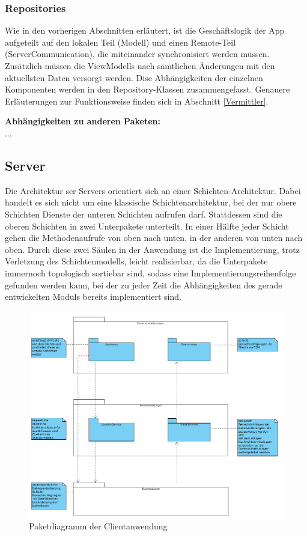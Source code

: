 \subsubsection{Repositories}
Wie in den vorherigen Abschnitten erläutert, ist die Geschäftslogik der App aufgeteilt auf den lokalen Teil (Modell) und einen Remote-Teil (ServerCommunication), die miteinander synchronisiert werden müssen. Zusätzlich müssen die ViewModells nach sämtlichen Änderungen mit den aktuellsten Daten versorgt werden. Dise Abhängigkeiten der einzelnen Komponenten werden in den Repository-Klassen zusammengefasst. Genauere Erläuterungen zur Funktionsweise finden sich in Abschnitt \ref{Vermittler}.

\textbf{Abhängigkeiten zu anderen Paketen:}\\
...

\subsection{Server}
Die Architektur ser Servers orientiert sich an einer Schichten-Architektur. Dabei handelt es sich nicht um eine klassische Schichtenarchitektur, bei der nur obere Schichten Dienste der unteren Schichten aufrufen darf. Stattdessen sind die oberen Schichten in zwei Unterpakete unterteilt. In einer Hälfte jeder Schicht gehen die Methodenaufrufe von oben nach unten, in der anderen von unten nach oben. Durch diese zwei Säulen in der Anwendung ist die Implementierung, trotz Verletzung des Schichtenmodells, leicht realisierbar, da die Unterpakete immernoch topologisch sortiebar sind, sodass
eine Implementierungsreihenfolge gefunden werden kann, bei der zu jeder Zeit die Abhängigkeiten des gerade entwickelten Moduls bereits implementiert sind.

\begin{figure}[H]
	\centering
	\includegraphics[scale=0.5]{../Klassendiagramme/paketdiagramm_server.png}
	\caption{Paketdiagramm der Clientanwendung}
\end{figure}

